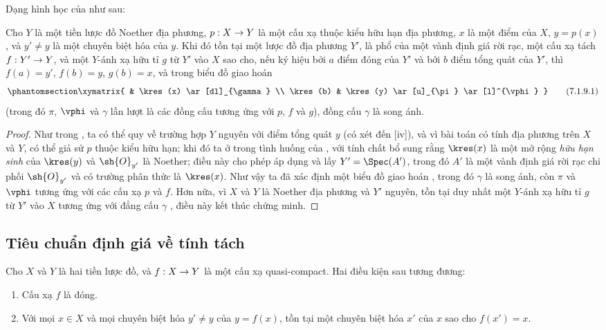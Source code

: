 \documentclass[oneside,10pt]{amsart}
\makeatletter
\newcommand{\ega@arrow}[2]{\mathchoice{#1}{#2}{#2}{#2}}
\renewcommand{\to}{\ega@arrow{\longrightarrow}{\rightarrow}}
\newcommand{\oldpage}[2][]{\marginnote{\normalfont\footnotesize\textbf{#1}~|~#2}\ignorespaces}
\let\EGAOriginalLabel\label
\renewcommand{\label}[1]{\phantomsection\EGAOriginalLabel{#1}}
\makeatother
\begin{document}
Dạng hình học của  như sau:
\oldpage[II]{141}
\begin{proposition}[7.1.9]
\label{II.7.1.9}
Cho $Y$ là một tiền lược đồ Noether địa phương, $p:X\to Y$ là một cấu xạ thuộc kiểu hữu hạn địa phương, $x$ là một điểm của $X$, $y=p(x)$, và $y'\neq y$ là một chuyên biệt hóa của $y$.
Khi đó tồn tại một lược đồ địa phương $Y'$, là phổ của một vành định giá rời rạc, một cấu xạ tách $f:Y'\to Y$, và một $Y$-ánh xạ hữu tỉ $g$ từ $Y'$ vào $X$ sao cho, nếu ký hiệu bởi $a$ điểm đóng của $Y'$ và bởi $b$ điểm tổng quát của $Y'$, thì $f(a)=y'$, $f(b)=y$, $g(b)=x$, và trong biểu đồ giao hoán
\[
\label{II.7.1.9.1}
    \xymatrix{
        & \kres(x) \ar[dl]_{\gamma}
    \\  \kres(b)
        & \kres(y) \ar[u]_{\pi} \ar[l]^{\vphi}
    }
\tag{7.1.9.1}
\]
(trong đó $\pi$, $\vphi$ và $\gamma$ lần lượt là các đồng cấu tương ứng với $p$, $f$ và $g$), đồng cấu $\gamma$ là song ánh.
\end{proposition}

\begin{proof}
Như trong , ta có thể quy về trường hợp $Y$ nguyên với điểm tổng quát $y$ (có xét đến [iv]), và vì bài toán có tính địa phương trên $X$ và $Y$, có thể giả sử $p$ thuộc kiểu hữu hạn;
khi đó ta ở trong tình huống của , với tính chất bổ sung rằng $\kres(x)$ là một mở rộng \emph{hữu hạn sinh} của $\kres(y)$  và $\sh{O}_{y'}$ là Noether;
điều này cho phép áp dụng  và lấy $Y'=\Spec(A')$, trong đó $A'$ là một vành định giá rời rạc chi phối $\sh{O}_{y'}$ và có trường phân thức là $\kres(x)$.
Như vậy ta đã xác định một biểu đồ giao hoán , trong đó $\gamma$ là song ánh, còn $\pi$ và $\vphi$ tương ứng với các cấu xạ $p$ và $f$.
Hơn nữa, vì $X$ và $Y$ là Noether địa phương  và $Y'$ nguyên, tồn tại duy nhất một $Y$-ánh xạ hữu tỉ $g$ từ $Y'$ vào $X$ tương ứng với đẳng cấu $\gamma$ , điều này kết thúc chứng minh.
\end{proof}

\subsection{Tiêu chuẩn định giá về tính tách}
\label{subsection:II.7.2}

\begin{proposition}[7.2.1]
\label{II.7.2.1}
Cho $X$ và $Y$ là hai tiền lược đồ, và $f:X\to Y$ là một cấu xạ quasi-compact.
Hai điều kiện sau tương đương:
\begin{enumerate}
    \item[\rm{(a)}] Cấu xạ $f$ là đóng.
    \item[\rm{(b)}] Với mọi $x\in X$ và mọi chuyên biệt hóa $y'\neq y$ của $y=f(x)$, tồn tại một chuyên biệt hóa $x'$ của $x$ sao cho $f(x')=x$.
\end{enumerate}
\end{proposition}
\end{document}

